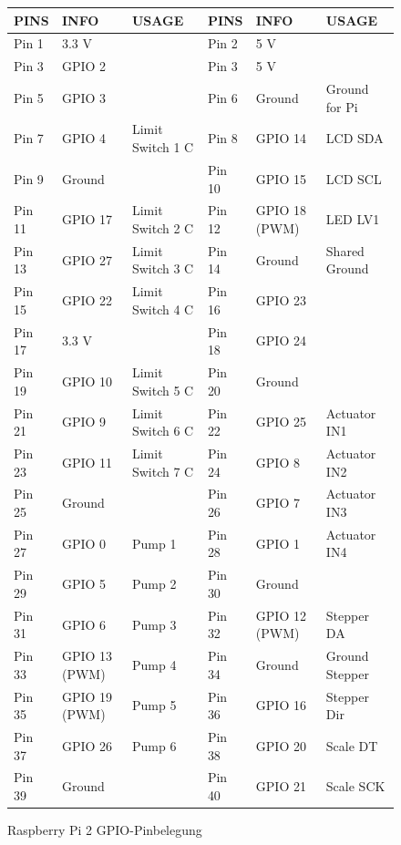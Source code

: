\begin{figure}[H]
  \footnotesize
  \begin{tabularx}{\textwidth}{|l|X|X|l|X|X|}
    \hline
    \textbf{PINS} & \textbf{INFO} & \textbf{USAGE} & \textbf{PINS} & \textbf{INFO} & \textbf{USAGE} \\
    \hline
    Pin 1 & 3.3 V & & Pin 2 & 5 V & \\
    \hline
    Pin 3 & GPIO 2 & & Pin 3 & 5 V & \\
    \hline
    Pin 5 & GPIO 3 & & Pin 6 & Ground & Ground for Pi \\
    \hline
    Pin 7 & GPIO 4 & Limit Switch 1 C & Pin 8 & GPIO 14 & LCD SDA \\
    \hline
    Pin 9 & Ground & & Pin 10 & GPIO 15 & LCD SCL \\
    \hline
    Pin 11 & GPIO 17 & Limit Switch 2 C & Pin 12 & GPIO 18 (PWM) & LED LV1 \\
    \hline
    Pin 13 & GPIO 27 & Limit Switch 3 C & Pin 14 & Ground & Shared Ground \\
    \hline
    Pin 15 & GPIO 22 & Limit Switch 4 C & Pin 16 & GPIO 23 & \\
    \hline
    Pin 17 & 3.3 V & & Pin 18 & GPIO 24 & \\
    \hline
    Pin 19 & GPIO 10 & Limit Switch 5 C & Pin 20 & Ground & \\
    \hline
    Pin 21 & GPIO 9 & Limit Switch 6 C & Pin 22 & GPIO 25 & Actuator IN1 \\
    \hline
    Pin 23 & GPIO 11 & Limit Switch 7 C & Pin 24 & GPIO 8 & Actuator IN2 \\
    \hline
    Pin 25 & Ground & & Pin 26 & GPIO 7 & Actuator IN3 \\
    \hline
    Pin 27 & GPIO 0 & Pump 1 & Pin 28 & GPIO 1 & Actuator IN4 \\
    \hline
    Pin 29 & GPIO 5 & Pump 2 & Pin 30 & Ground & \\
    \hline
    Pin 31 & GPIO 6 & Pump 3 & Pin 32 & GPIO 12 (PWM) & Stepper DA \\
    \hline
    Pin 33 & GPIO 13 (PWM) & Pump 4 & Pin 34 & Ground & Ground Stepper \\
    \hline
    Pin 35 & GPIO 19 (PWM) & Pump 5 & Pin 36 & GPIO 16 & Stepper Dir \\
    \hline
    Pin 37 & GPIO 26 & Pump 6 & Pin 38 & GPIO 20 & Scale DT \\
    \hline
    Pin 39 & Ground & & Pin 40 & GPIO 21 & Scale SCK \\
    \hline
  \end{tabularx}
  \normalsize
  \caption{Raspberry Pi 2 GPIO-Pinbelegung}
  \label{fig:raspberry_pi_pinout_tabularx}
\end{figure}
  